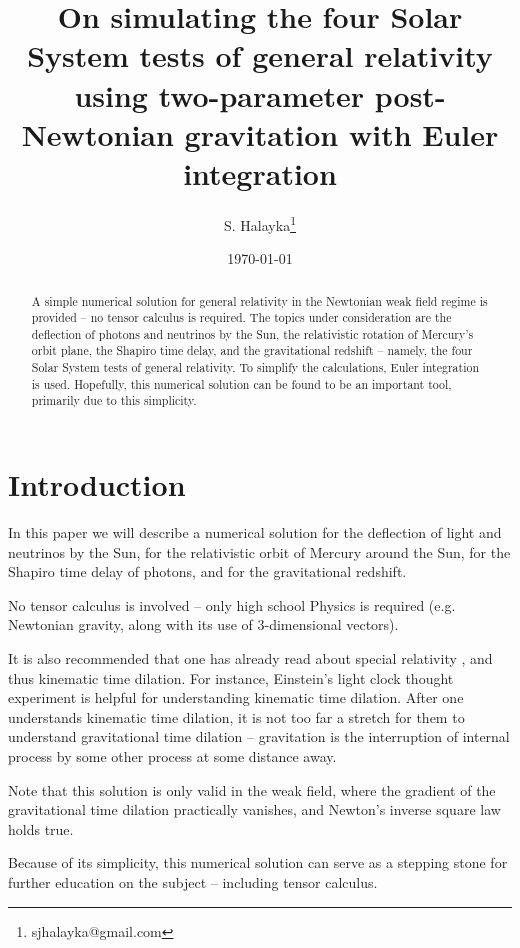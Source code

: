 \documentclass[12pt]{article}
\title{On simulating the four Solar System tests of general relativity using two-parameter post-Newtonian gravitation with Euler integration}
\author{S. Halayka\footnote{sjhalayka@gmail.com}}
\date{\today\;\currenttime}
\begin{document}
 
\maketitle

\begin{abstract}
A simple numerical solution for general relativity in the Newtonian weak field regime is provided -- no tensor calculus is required.
The topics under consideration are the deflection of photons and neutrinos by the Sun, the relativistic rotation of Mercury's orbit plane, the Shapiro time delay, and the gravitational redshift -- namely, the four Solar System tests of general relativity.
To simplify the calculations, Euler integration is used.
Hopefully, this numerical solution can be found to be an important tool, primarily due to this simplicity.
\end{abstract}


\section{Introduction}

In this paper we will describe a numerical solution for the deflection of light and neutrinos by the Sun, for the relativistic orbit of Mercury around the Sun, for the Shapiro time delay of photons, and for the gravitational redshift.

No tensor calculus is involved -- only high school Physics is required (e.g. Newtonian gravity, along with its use of 3-dimensional vectors).

It is also recommended that one has already read about special relativity \cite{einstein, morin}, and thus kinematic time dilation.
For instance, Einstein's light clock thought experiment is helpful for understanding kinematic time dilation.
After one understands kinematic time dilation, it is not too far a stretch for them to understand gravitational time dilation -- gravitation is the interruption of internal process by some other process at some distance away.

Note that this solution is only valid in the weak field, where the gradient of the gravitational time dilation practically vanishes, and Newton's inverse square law holds true.

Because of its simplicity, this numerical solution can serve as a stepping stone for further education on the subject -- including tensor calculus.
\end{document}
